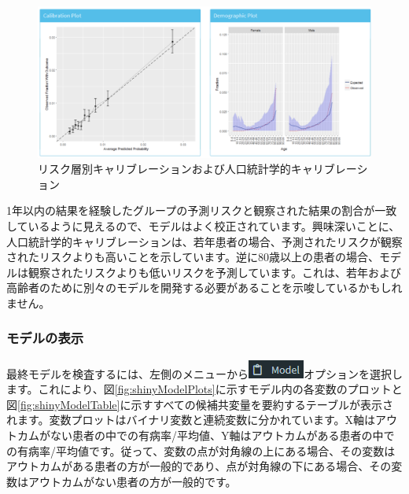 \documentclass[
  11pt]{book}
\theoremstyle{definition}
\theoremstyle{definition}
\theoremstyle{definition}
\theoremstyle{definition}
\theoremstyle{remark}
\begin{document}
\begin{figure}

{\centering \includegraphics[width=1\linewidth]{images/PatientLevelPrediction/shiny/shinyPerformanceCal} 

}

\caption{リスク層別キャリブレーションおよび人口統計学的キャリブレーション}\label{fig:shinyPerformanceCal}
\end{figure}

1年以内の結果を経験したグループの予測リスクと観察された結果の割合が一致しているように見えるので、モデルはよく校正されています。興味深いことに、人口統計学的キャリブレーションは、若年患者の場合、予測されたリスクが観察されたリスクよりも高いことを示しています。逆に80歳以上の患者の場合、モデルは観察されたリスクよりも低いリスクを予測しています。これは、若年および高齢者のために別々のモデルを開発する必要があることを示唆しているかもしれません。

\subsubsection*{モデルの表示}\label{ux30e2ux30c7ux30ebux306eux8868ux793a}

最終モデルを検査するには、左側のメニューから\includegraphics{images/PatientLevelPrediction/modelButton.png}オプションを選択します。これにより、図\ref{fig:shinyModelPlots}に示すモデル内の各変数のプロットと図\ref{fig:shinyModelTable}に示すすべての候補共変量を要約するテーブルが表示されます。変数プロットはバイナリ変数と連続変数に分かれています。X軸はアウトカムがない患者の中での有病率/平均値、Y軸はアウトカムがある患者の中での有病率/平均値です。従って、変数の点が対角線の上にある場合、その変数はアウトカムがある患者の方が一般的であり、点が対角線の下にある場合、その変数はアウトカムがない患者の方が一般的です。
\end{document}
